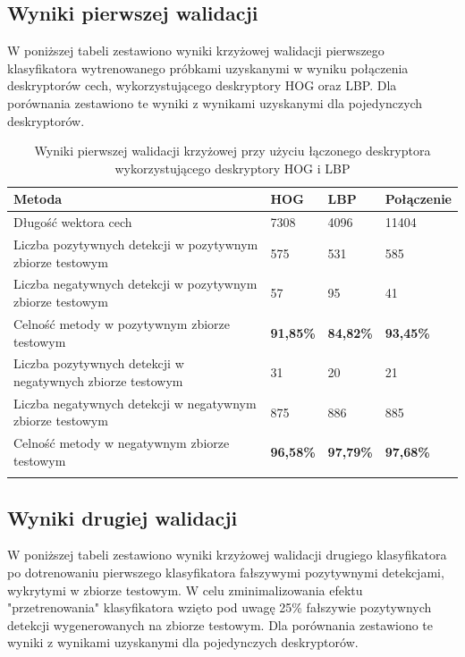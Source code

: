 \subsection{Wyniki pierwszej walidacji}

W poniższej tabeli zestawiono wyniki krzyżowej walidacji pierwszego klasyfikatora wytrenowanego 
próbkami uzyskanymi w wyniku połączenia deskryptorów cech, wykorzystującego deskryptory HOG oraz LBP. Dla porównania zestawiono te wyniki z wynikami uzyskanymi dla pojedynczych deskryptorów.

\begin{center}
    \begin{longtable}{ | p{5cm} | p{3cm} | p{3cm} | p{3cm} |}
    \hline
	Metoda & HOG & LBP & Połączenie \\ \hline
    Długość wektora cech & 7308 & 4096 & 11404 \\ \hline
    Liczba pozytywnych detekcji w pozytywnym zbiorze testowym & 575 & 531 & 585 \\ \hline
    Liczba negatywnych detekcji w pozytywnym zbiorze testowym & 57 & 95 & 41 \\ \hline
    Celność metody w pozytywnym zbiorze testowym & \textbf{91,85\%} & \textbf{84,82\%} & \textbf{93,45\%} \\ \hline
    Liczba pozytywnych detekcji w negatywnych zbiorze testowym & 31 & 20 & 21 \\ \hline
    Liczba negatywnych detekcji w negatywnym zbiorze testowym & 875 & 886 & 885 \\ \hline
    Celność metody w negatywnym zbiorze testowym & \textbf{96,58\%} & \textbf{97,79\%} & \textbf{97,68\%} \\ \hline
    \caption{Wyniki pierwszej walidacji krzyżowej przy użyciu łączonego deskryptora wykorzystującego deskryptory HOG i LBP} \\
    \end{longtable}
\end{center}


\subsection{Wyniki drugiej walidacji}
W poniższej tabeli zestawiono wyniki krzyżowej walidacji drugiego klasyfikatora po dotrenowaniu pierwszego klasyfikatora fałszywymi pozytywnymi detekcjami, wykrytymi w zbiorze testowym. W celu zminimalizowania efektu "przetrenowania" klasyfikatora wzięto pod uwagę 25\% fałszywie pozytywnych detekcji wygenerowanych na zbiorze testowym. Dla porównania zestawiono te wyniki z wynikami uzyskanymi dla pojedynczych deskryptorów.

